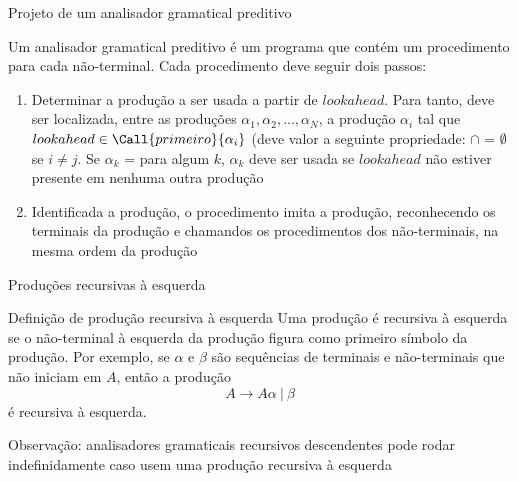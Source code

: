 \begin{frame}[fragile]{Projeto de um analisador gramatical preditivo}

    Um analisador gramatical preditivo é um programa que contém um procedimento para cada não-terminal. Cada procedimento deve seguir dois passos:
    \pause

    \begin{enumerate}
        \item Determinar a produção a ser usada a partir de $lookahead$. Para tanto, deve ser localizada, entre as produções $\alpha_1, \alpha_2, \ldots, \alpha_N$,
            a produção $\alpha_i$ tal que $lookahead \in \Call{primeiro}{\alpha_i}$ (deve valor a seguinte propriedade:  $\cap$
             = $\emptyset$ se $i\neq j$. Se $\alpha_k$ =  para algum $k$, $\alpha_k$ deve ser usada se $lookahead$ não estiver
            presente em nenhuma outra produção
        \pause

        \item Identificada a produção, o procedimento imita a produção, reconhecendo os terminais da produção e chamandos os procedimentos dos não-terminais, na
            mesma ordem da produção
    \end{enumerate}

\end{frame}

\begin{frame}[fragile]{Produções recursivas à esquerda}

    \begin{block}{Definição de produção recursiva à esquerda}
        Uma produção é recursiva à esquerda se o não-terminal à esquerda da produção figura como primeiro símbolo da produção. Por exemplo, se $\alpha$ e $\beta$
        são sequências de terminais e não-terminais que não iniciam em $A$, então a produção
        \[
            A \to A\alpha\ |\ \beta
        \]
        é recursiva à esquerda.
    \end{block}
    \pause

    \vspace{0.2in}
    Observação: analisadores gramaticais recursivos descendentes pode rodar indefinidamente caso usem uma produção recursiva à esquerda
\end{frame}

